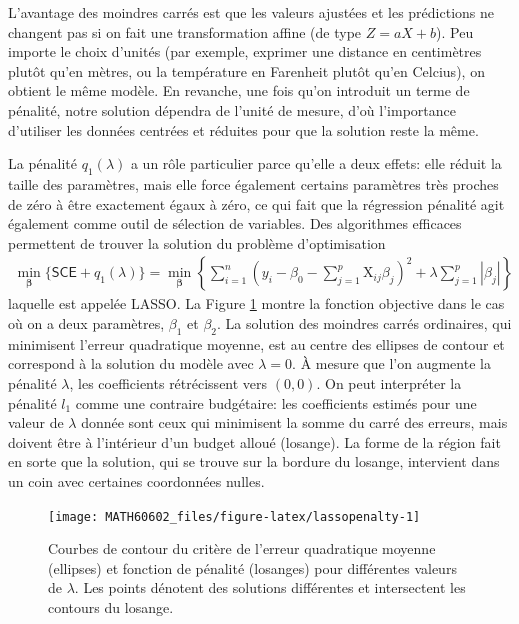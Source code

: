 \documentclass[
  11pt,
  letterpaper,
]{book}
\theoremstyle{definition}
\theoremstyle{definition}
\theoremstyle{definition}
\theoremstyle{definition}
\theoremstyle{remark}
\begin{document}
L'avantage des moindres carrés est que les valeurs ajustées et les prédictions ne changent pas si on fait une transformation affine (de type \(Z = aX+b\)).
Peu importe le choix d'unités (par exemple, exprimer une distance en centimètres plutôt qu'en mètres, ou la température en Farenheit plutôt qu'en Celcius), on obtient le même modèle. En revanche, une fois qu'on introduit un terme de pénalité, notre solution dépendra de l'unité de mesure, d'où l'importance d'utiliser les données centrées et réduites pour que la solution reste la même.

La pénalité \(q_1(\lambda)\) a un rôle particulier parce qu'elle a deux effets: elle réduit la taille des paramètres, mais elle force également certains paramètres très proches de zéro à être exactement égaux à zéro, ce qui fait que la régression pénalité agit également comme outil de sélection de variables. Des algorithmes efficaces permettent de trouver la solution du problème d'optimisation
\begin{align*}
\min_{\boldsymbol{\beta}} \{\mathsf{SCE} + q_1(\lambda)\} = \min_{\boldsymbol{\beta}}  \left\{\sum_{i=1}^n \left(y_i - \beta_0 - \sum_{j=1}^p\mathrm{X}_{ij}\beta_{j}\right)^2 +
\lambda \sum_{j=1}^p |\beta_j|\right\}
\end{align*}
laquelle est appelée LASSO. La Figure \ref{fig:lassopenalty} montre la fonction objective dans le cas où on a deux paramètres, \(\beta_1\) et \(\beta_2\). La solution des moindres carrés ordinaires, qui minimisent l'erreur quadratique moyenne, est au centre des ellipses de contour et correspond à la solution du modèle avec \(\lambda=0\). À mesure que l'on augmente la pénalité \(\lambda\), les coefficients rétrécissent vers \((0, 0)\). On peut interpréter la pénalité \(l_1\) comme une contraire budgétaire: les coefficients estimés pour une valeur de \(\lambda\) donnée sont ceux qui minimisent la somme du carré des erreurs, mais doivent être à l'intérieur d'un budget alloué (losange). La forme de la région fait en sorte que la solution, qui se trouve sur la bordure du losange, intervient dans un coin avec certaines coordonnées nulles.

\begin{figure}

{\centering \texttt{[image: MATH60602\_files/figure-latex/lassopenalty-1]} 

}

\caption{Courbes de contour du critère de l'erreur quadratique moyenne (ellipses) et fonction de pénalité (losanges) pour différentes valeurs de $\lambda$. Les points dénotent des solutions différentes et intersectent les contours du losange.}\label{fig:lassopenalty}
\end{figure}
\end{document}

